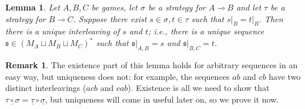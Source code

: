 \documentclass[11pt]{article} %
\theoremstyle{plain} %
\newtheorem{lemma}[theorem]{Lemma}
\theoremstyle{definition} %
\newtheorem{remark}[theorem]{Remark}
\theoremstyle{exercisestyle}
\renewcommand{\implies}{\multimap}
\newcommand{\comp}[2]{#1 \circ #2}
\newcommand{\cprd}{\sqcup}
\newcommand{\s}{\mathfrak s}
\newcommand{\grel}[1]{\underline{#1}}
\begin{document}
\begin{lemma}
  \label{HylandSchalkIsFunctor}
  Let $A,B,C$ be games, let $\sigma$ be a strategy for $A\implies B$ and let $\tau$ be a strategy for $B\implies C$.  Suppose there exist $s\in\sigma,t\in\tau$ such that $s\vert_B=t\vert_B$.  Then there is a unique \emph{interleaving} of $s$ and $t$; i.e., there is a unique sequence $\s\in (M_A\cprd M_B\cprd M_C)^*$ such that $\s\vert_{A,B}=s$ and $\s\vert_{B,C}=t$.  
\end{lemma}
\begin{remark}
  The existence part of this lemma holds for arbitrary sequences in an easy way, but uniqueness does not: for example, the sequences $ab$ and $cb$ have two distinct interleavings ($acb$ and $cab$).  Existence is all we need to show that $\grel{\comp\tau\sigma}=\comp{\grel\tau}{\grel\sigma}$, but uniqueness will come in useful later on, so we prove it now.
\end{remark}
\end{document}
